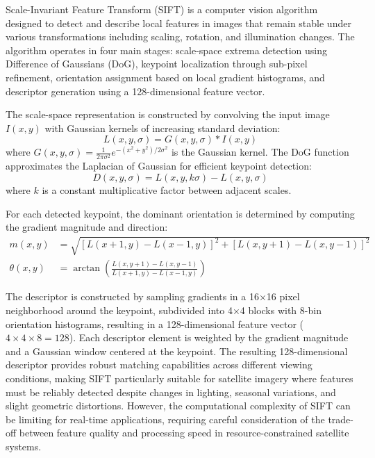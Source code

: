 




Scale-Invariant Feature Transform (SIFT) is a computer vision algorithm designed to detect and describe local features in images that remain 
stable under various transformations including scaling, rotation, and illumination changes. The algorithm operates in four main stages: scale-space extrema 
detection using Difference of Gaussians (DoG), keypoint localization through sub-pixel refinement, orientation assignment based on local gradient histograms, 
and descriptor generation using a 128-dimensional feature vector.

The scale-space representation is constructed by convolving the input image $I(x,y)$ with Gaussian kernels of increasing standard deviation:
\begin{equation}
L(x,y,\sigma) = G(x,y,\sigma) * I(x,y)
\end{equation}
where $G(x,y,\sigma) = \frac{1}{2\pi\sigma^2}e^{-(x^2+y^2)/2\sigma^2}$ is the Gaussian kernel. The DoG function approximates the Laplacian of Gaussian for 
efficient keypoint detection:
\begin{equation}
D(x,y,\sigma) = L(x,y,k\sigma) - L(x,y,\sigma)
\end{equation}
where $k$ is a constant multiplicative factor between adjacent scales.

For each detected keypoint, the dominant orientation is determined by computing the gradient magnitude and direction:
\begin{align}
m(x,y) &= \sqrt{[L(x+1,y) - L(x-1,y)]^2 + [L(x,y+1) - L(x,y-1)]^2} \\
\theta(x,y) &= \arctan\left(\frac{L(x,y+1) - L(x,y-1)}{L(x+1,y) - L(x-1,y)}\right)
\end{align}

The descriptor is constructed by sampling gradients in a 16×16 pixel neighborhood around the keypoint, subdivided into 4×4 blocks with 
8-bin orientation histograms, resulting in a 128-dimensional feature vector ($4 \times 4 \times 8 = 128$). Each descriptor element is weighted by 
the gradient magnitude and a Gaussian window centered at the keypoint. The resulting 128-dimensional descriptor provides robust matching capabilities 
across different viewing conditions, making SIFT particularly suitable for satellite imagery where features must be reliably detected despite changes in lighting, 
seasonal variations, and slight geometric distortions. However, the computational complexity of SIFT can be limiting for real-time applications, requiring careful 
consideration of the trade-off between feature quality and processing speed in resource-constrained satellite systems.

